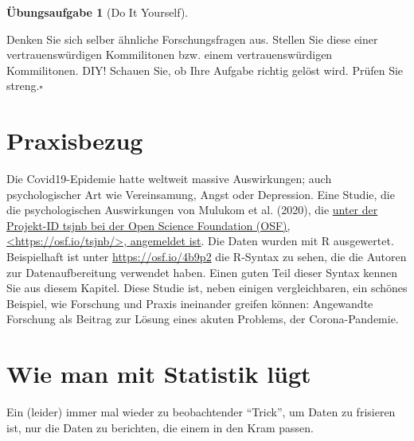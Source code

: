 \documentclass[
  letterpaper,
]{scrbook}
\theoremstyle{definition}
\theoremstyle{definition}
\theoremstyle{definition}
\newtheorem{exercise}{Übungsaufgabe}[chapter]
\theoremstyle{remark}
\begin{document}
\begin{exercise}[Do It
Yourself]\protect\hypertarget{exr-diy}{}\label{exr-diy}

Denken Sie sich selber ähnliche Forschungsfragen aus. Stellen Sie diese
einer vertrauenswürdigen Kommilitonen bzw. einem vertrauenswürdigen
Kommilitonen. DIY! Schauen Sie, ob Ihre Aufgabe richtig gelöst wird.
Prüfen Sie streng.\(\square\)

\end{exercise}

\section{Praxisbezug}\label{praxisbezug-2}

Die Covid19-Epidemie hatte weltweit massive Auswirkungen; auch
psychologischer Art wie Vereinsamung, Angst oder Depression. Eine
Studie, die die psychologischen Auswirkungen von Mulukom et al. (2020),
die \href{https://osf.io/tsjnb/}{unter der Projekt-ID tsjnb bei der Open
Science Foundation (OSF), \textless https://osf.io/tsjnb/\textgreater,
angemeldet ist}. Die Daten wurden mit R ausgewertet. Beispielhaft ist
unter \url{https://osf.io/4b9p2} die R-Syntax zu sehen, die die Autoren
zur Datenaufbereitung verwendet haben. Einen guten Teil dieser Syntax
kennen Sie aus diesem Kapitel. Diese Studie ist, neben einigen
vergleichbaren, ein schönes Beispiel, wie Forschung und Praxis
ineinander greifen können: Angewandte Forschung als Beitrag zur Lösung
eines akuten Problems, der Corona-Pandemie.

\section{Wie man mit Statistik
lügt}\label{wie-man-mit-statistik-luxfcgt-1}

Ein (leider) immer mal wieder zu beobachtender ``Trick'', um Daten zu
frisieren ist, nur die Daten zu berichten, die einem in den Kram passen.
\end{document}
